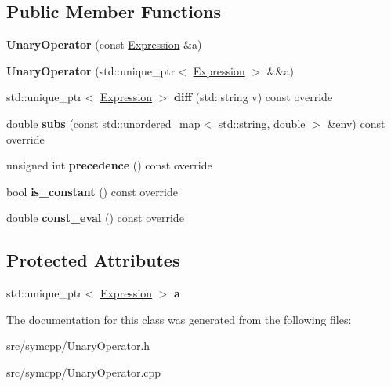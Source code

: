\subsection*{Public Member Functions}
\begin{DoxyCompactItemize}
\item 
{\bfseries Unary\+Operator} (const \hyperlink{classExpression}{Expression} \&a)\hypertarget{classUnaryOperator_aa185bbcf804d574507972d4f45d172d8}{}\label{classUnaryOperator_aa185bbcf804d574507972d4f45d172d8}

\item 
{\bfseries Unary\+Operator} (std\+::unique\+\_\+ptr$<$ \hyperlink{classExpression}{Expression} $>$ \&\&a)\hypertarget{classUnaryOperator_a3e4672d543d9b33f3d8bbfdd4ff998ac}{}\label{classUnaryOperator_a3e4672d543d9b33f3d8bbfdd4ff998ac}

\item 
std\+::unique\+\_\+ptr$<$ \hyperlink{classExpression}{Expression} $>$ {\bfseries diff} (std\+::string v) const override\hypertarget{classUnaryOperator_aa88c836ae89698df8030fc83191d7c10}{}\label{classUnaryOperator_aa88c836ae89698df8030fc83191d7c10}

\item 
double {\bfseries subs} (const std\+::unordered\+\_\+map$<$ std\+::string, double $>$ \&env) const override\hypertarget{classUnaryOperator_aa0b4d6676a9f1104b2ab435602c0dac4}{}\label{classUnaryOperator_aa0b4d6676a9f1104b2ab435602c0dac4}

\item 
unsigned int {\bfseries precedence} () const override\hypertarget{classUnaryOperator_a5d49e758fb15279704b9a8bdfb07eacb}{}\label{classUnaryOperator_a5d49e758fb15279704b9a8bdfb07eacb}

\item 
bool {\bfseries is\+\_\+constant} () const override\hypertarget{classUnaryOperator_ac4820afc85fe01a7bdffe702188aa066}{}\label{classUnaryOperator_ac4820afc85fe01a7bdffe702188aa066}

\item 
double {\bfseries const\+\_\+eval} () const override\hypertarget{classUnaryOperator_a01683419a0fa7da8137ca7df8e59c152}{}\label{classUnaryOperator_a01683419a0fa7da8137ca7df8e59c152}

\end{DoxyCompactItemize}
\subsection*{Protected Attributes}
\begin{DoxyCompactItemize}
\item 
std\+::unique\+\_\+ptr$<$ \hyperlink{classExpression}{Expression} $>$ {\bfseries a}\hypertarget{classUnaryOperator_ab2f9ff3b9842d59b6bec6d1f92c4bd35}{}\label{classUnaryOperator_ab2f9ff3b9842d59b6bec6d1f92c4bd35}

\end{DoxyCompactItemize}


The documentation for this class was generated from the following files\+:\begin{DoxyCompactItemize}
\item 
src/symcpp/Unary\+Operator.\+h\item 
src/symcpp/Unary\+Operator.\+cpp\end{DoxyCompactItemize}
